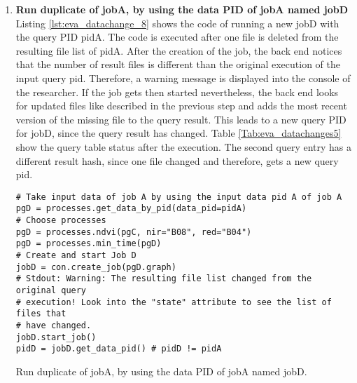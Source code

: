 \documentclass[draft,final]{vutinfth} %
\newenvironment{code}{\captionsetup{type=listing}}{}
\begin{document}
\begin{enumerate}
\begin{code}
	\begin{verbatim} 
[{'timestamp': '2019-03-31 17:44:43', 
'path': '/eodc/products/copernicus.eu/s2a_prd_msil1c/2017/05/24/
 S2A_MSIL1C_20170524T101031_N0205_R022_T32TQR_20170524T101353_new.zip'}]
	\end{verbatim}
	\caption{List of files that replaced original files of the query result.}
	\label{lst:eva_datachange_state}
\end{code}

	\item \textbf{Run duplicate of jobA, by using the data PID of jobA named jobD}\\
	Listing \ref{lst:eva_datachange_8} shows the code of running a new jobD with the query PID pidA. The code is executed after one file is deleted from the resulting file list of pidA. After the creation of the job, the back end notices that the number of result files is different than the original execution of the input query pid. Therefore, a warning message is displayed into the console of the researcher. If the job gets then started nevertheless, the back end looks for updated files like described in the previous step and adds the most recent version of the missing file to the query result. This leads to a new query PID for jobD, since the query result has changed. Table \ref{Tab:eva_datachanges5} show the query table status after the execution. The second query entry has a different result hash, since one file changed and therefore, gets a new query pid.  
	\begin{code}
	\begin{verbatim}
# Take input data of job A by using the input data pid A of job A
pgD = processes.get_data_by_pid(data_pid=pidA)
# Choose processes
pgD = processes.ndvi(pgC, nir="B08", red="B04")
pgD = processes.min_time(pgD)
# Create and start Job D
jobD = con.create_job(pgD.graph)
# Stdout: Warning: The resulting file list changed from the original query
# execution! Look into the "state" attribute to see the list of files that
# have changed. 
jobD.start_job()
pidD = jobD.get_data_pid() # pidD != pidA
	\end{verbatim}
	\caption{Run duplicate of jobA, by using the data PID of jobA named jobD.}
	\label{lst:eva_datachange_8}
	\end{code}


\end{enumerate}
\end{document}
